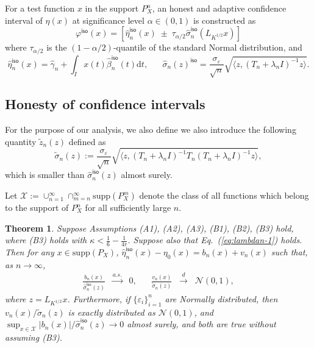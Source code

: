 \documentclass[11pt,a4paper]{article}
\renewcommand{\hat}{\widehat}
\renewcommand{\tilde}{\widetilde}
\theoremstyle{definition}
\theoremstyle{plain}
\newtheorem{theorem}{Theorem}[section]
\theoremstyle{remark}
\newcommand{\supp}{\mathrm{supp}}
\newcommand{\mX}{\mathcal X}
\newcommand{\ud}{\mathrm d}
\newcommand{\iso}{\mathsf{iso}}
\begin{document}
For a test function $x$ in the support $P_X^n$, an honest and adaptive confidence interval of $\eta(x)$ at significance level $\alpha\in(0,1)$ is constructed as
$$
\varphi^\iso(x) = [\hat\eta_n^\iso(x)\;\pm\;\tau_{\alpha/2}\hat\sigma_n^\iso(L_{K^{1/2}}x)]
$$
where $\tau_{\alpha/2}$ is the $(1-\alpha/2)$-quantile of the standard Normal distribution, and
$$
\hat\eta_n^\iso(x) = \hat\gamma_n + \int_I x(t)\hat\beta_n^\iso(t)\ud t,\;\;\;\;\;\;\hat\sigma_n(z)^\iso = \frac{\sigma_\varepsilon}{\sqrt{n}}\sqrt{\langle z, (T_n+\lambda_n I)^{-1}z\rangle}.
$$

\subsection{Honesty of confidence intervals}

For the purpose of our analysis, we also define
we also introduce the following quantity $\tilde z_n(z)$ defined as
$$
\tilde\sigma_n(z) := \frac{\sigma_\varepsilon}{\sqrt{n}}\sqrt{\langle z, (T_n+\lambda_n I)^{-1}T_n(T_n+\lambda_n I)^{-1}z\rangle},
$$
which is smaller than $\hat\sigma_n^\iso(z)$ almost surely.

Let $\mX := \cup_{n=1}^{\infty}\cap_{m=n}^{\infty}\supp(P_X^m)$ denote the class of all functions which belong to the support of $P_X^n$ for all sufficiently large $n$.

\begin{theorem}
Suppose Assumptions (A1), (A2), (A3), (B1), (B2), (B3) hold, where (B3) holds with $\kappa<\frac{1}{6}-\frac{1}{4r}$. Suppose also that Eq.~(\ref{eq:lambdan-1}) holds. Then 
for any $x\in\supp(P_X)$, $\hat\eta_n^\iso(x)-\eta_0(x)=b_n(x)+v_n(x)$ such that, as $n\to\infty$, 
\begin{align*}
\frac{b_n(x)}{\hat\sigma_n^\iso(z)}\;\;\overset{a.s.}{\to}\;\; 0,\;\;\;\;\;\;\frac{v_n(x)}{\tilde\sigma_n(z)}\;\;\overset{d}{\to}\;\;\mathcal N(0,1),
\end{align*}
where $z=L_{K^{1/2}}x$.
Furthermore, if $\{\varepsilon_i\}_{i=1}^n$ are Normally distributed, then $v_n(x)/\tilde\sigma_n(z)$ is exactly distributed as $\mathcal N(0,1)$, and
$\sup_{x\in\mX}|b_n(x)|/\hat\sigma_n^{\iso}(z)\to 0$ almost surely, and both are true without assuming (B3).
\label{thm:isokrr-limiting}
\end{theorem}
\end{document}
